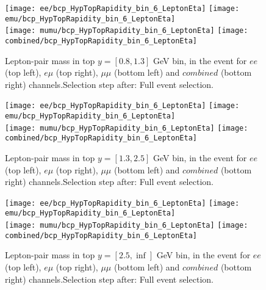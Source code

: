 \documentclass[12pt, a4paper, titlepage]{article}
\begin{document}
\clearpage
\newpage
\begin{figure}
  \texttt{[image: ee/bcp\_HypTopRapidity\_bin\_6\_LeptonEta]}
  \texttt{[image: emu/bcp\_HypTopRapidity\_bin\_6\_LeptonEta]}\\
  \texttt{[image: mumu/bcp\_HypTopRapidity\_bin\_6\_LeptonEta]}
  \texttt{[image: combined/bcp\_HypTopRapidity\_bin\_6\_LeptonEta]}
\caption{Lepton-pair mass in top $y = [0.8,1.3]$ GeV bin, in the event for $ee$ (top left), $e\mu$ (top right), $\mu\mu$ (bottom left) and $combined$ (bottom right) channels.\newline Selection step after: Full event selection.}
\end{figure}

\clearpage
\newpage
\begin{figure}
  \texttt{[image: ee/bcp\_HypTopRapidity\_bin\_6\_LeptonEta]}
  \texttt{[image: emu/bcp\_HypTopRapidity\_bin\_6\_LeptonEta]}\\
  \texttt{[image: mumu/bcp\_HypTopRapidity\_bin\_6\_LeptonEta]}
  \texttt{[image: combined/bcp\_HypTopRapidity\_bin\_6\_LeptonEta]}
\caption{Lepton-pair mass in top $y = [1.3,2.5]$ GeV bin, in the event for $ee$ (top left), $e\mu$ (top right), $\mu\mu$ (bottom left) and $combined$ (bottom right) channels.\newline Selection step after: Full event selection.}
\end{figure}

\clearpage
\newpage
\begin{figure}
  \texttt{[image: ee/bcp\_HypTopRapidity\_bin\_6\_LeptonEta]}
  \texttt{[image: emu/bcp\_HypTopRapidity\_bin\_6\_LeptonEta]}\\
  \texttt{[image: mumu/bcp\_HypTopRapidity\_bin\_6\_LeptonEta]}
  \texttt{[image: combined/bcp\_HypTopRapidity\_bin\_6\_LeptonEta]}
\caption{Lepton-pair mass in top $y = [2.5,\inf]$ GeV bin, in the event for $ee$ (top left), $e\mu$ (top right), $\mu\mu$ (bottom left) and $combined$ (bottom right) channels.\newline Selection step after: Full event selection.}
\end{figure}

\clearpage
\newpage
\end{document}
